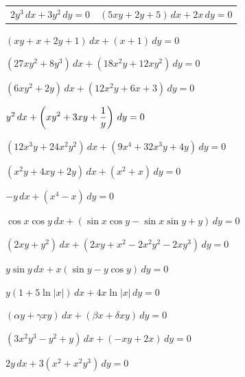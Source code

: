 \begin{exerciselist}
  \begin{tabular}[t]{@{}p{168pt}@{}p{168pt}}
    \item\label{exer:2.6.5} $2y^{3}\,dx+3y^{2}\,dy=0$ &
    \item\label{exer:2.6.6} $(5xy+2y+5)\,dx+2x\,dy=0$
  \end{tabular}

  \item\label{exer:2.6.7} $(xy+x+2y+1)\,dx+(x+1)\,dy=0$

  \item\label{exer:2.6.8} $(27xy^{2}+8y^{3})\,dx+(18x^{2}y+12xy^{2})\,dy=0$

  \item\label{exer:2.6.9} $(6xy^{2}+2y)\,dx+(12x^{2}y+6x+3)\,dy=0$

  \item\label{exer:2.6.10} $y^{2}\,dx+\displaystyle{\left(xy^{2}+3xy+\frac{1}{y}\right)\,dy=0}$

  \item\label{exer:2.6.11} $(12x^{3}y+24x^{2}y^{2})\,dx+(9x^{4}+32x^{3}y+4y)\,dy=0$

  \item\label{exer:2.6.12} $(x^{2}y+4xy+2y)\,dx+(x^{2}+x)\,dy=0$

  \item\label{exer:2.6.13} $-y\,dx+(x^{4}-x)\,dy=0$

  \item\label{exer:2.6.14} $\cos x\cos y\,dx +(\sin x\cos y-\sin x\sin y+y)\,dy=0$

  \item\label{exer:2.6.15} $(2xy+y^{2})\,dx+(2xy+x^{2}-2x^{2}y^{2}-2xy^{3})\,dy=0$

  \item\label{exer:2.6.16} $y\sin y\,dx+x(\sin y-y\cos y)\,dy=0$


  \item\label{exer:2.6.17} $y(1+5\ln|x|)\,dx+4x\ln|x|\,dy=0$

  \item\label{exer:2.6.18} $(\alpha y+\gamma xy)\,dx+(\beta x+\delta xy)\,dy=0$

  \item\label{exer:2.6.19} $(3x^{2}y^{3}-y^{2}+y)\,dx+(-xy+2x)\,dy=0$

  \item\label{exer:2.6.20} $2y\,dx+3(x^{2}+x^{2}y^{3})\,dy=0$


\end{exerciselist}
